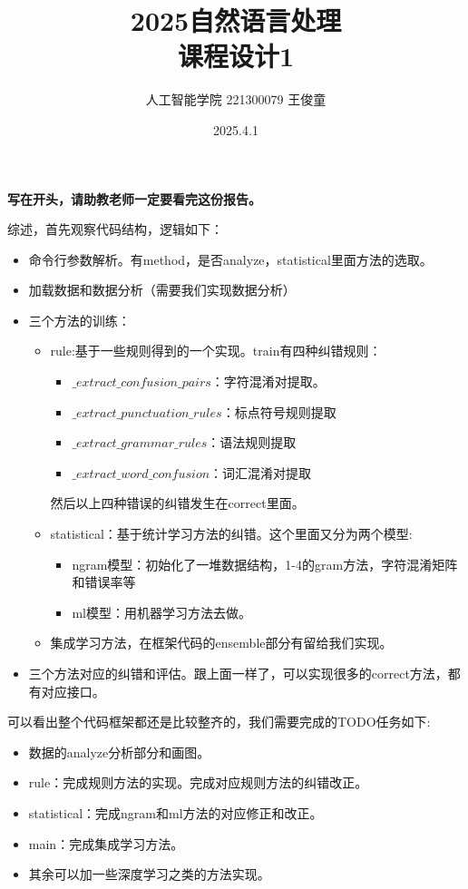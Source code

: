 \documentclass[answers]{exam}  %
\title{2025自然语言处理 \\ 课程设计1}
\date{2025.4.1}
\author{人工智能学院 221300079 王俊童}
\begin{document}
\maketitle
\textbf{写在开头，请助教老师一定要看完这份报告。}

综述，首先观察代码结构，逻辑如下：
\begin{itemize}
    \item 命令行参数解析。有method，是否analyze，statistical里面方法的选取。
    \item 加载数据和数据分析（需要我们实现数据分析）
    \item 三个方法的训练：
    \begin{itemize}
        \item rule:基于一些规则得到的一个实现。train有四种纠错规则：
        \begin{itemize}
            \item $\_extract\_confusion\_pairs$：字符混淆对提取。
            \item $\_extract\_punctuation\_rules$：标点符号规则提取
            \item $\_extract\_grammar\_rules$：语法规则提取
            \item $\_extract\_word\_confusion$：词汇混淆对提取
        \end{itemize}
        然后以上四种错误的纠错发生在correct里面。
        \item statistical：基于统计学习方法的纠错。这个里面又分为两个模型:
        \begin{itemize}
            \item ngram模型：初始化了一堆数据结构，1-4的gram方法，字符混淆矩阵和错误率等
            \item ml模型：用机器学习方法去做。
        \end{itemize}
        \item 集成学习方法，在框架代码的ensemble部分有留给我们实现。
    \end{itemize}
    \item 三个方法对应的纠错和评估。跟上面一样了，可以实现很多的correct方法，都有对应接口。
\end{itemize}
可以看出整个代码框架都还是比较整齐的，我们需要完成的TODO任务如下:
\begin{itemize}
    \item 数据的analyze分析部分和画图。
    \item rule：完成规则方法的实现。完成对应规则方法的纠错改正。
    \item statistical：完成ngram和ml方法的对应修正和改正。
    \item main：完成集成学习方法。
    \item 其余可以加一些深度学习之类的方法实现。
\end{itemize}
\end{document}
